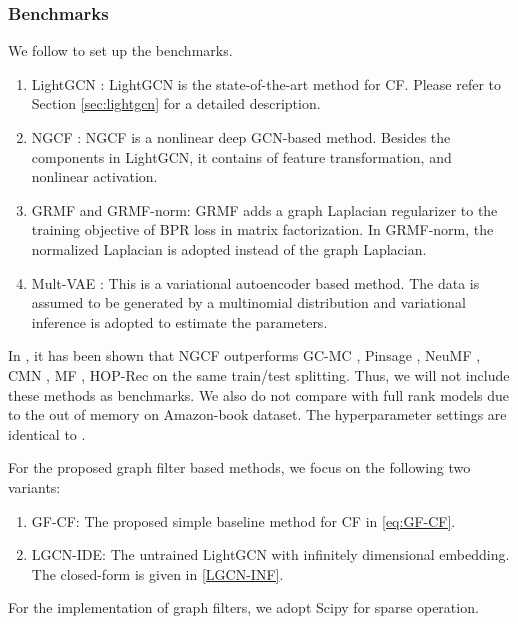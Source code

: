 \documentclass[sigconf]{acmart}
\begin{document}
\subsubsection{Benchmarks}
We follow \cite{he2020lightgcn} to set up the benchmarks.  
\begin{enumerate}
    \item LightGCN \cite{he2020lightgcn}: LightGCN is the state-of-the-art method for CF. Please refer to Section \ref{sec:lightgcn} for a detailed description. 
    \item NGCF \cite{wang2019neural}: NGCF is a nonlinear deep GCN-based method. Besides the components in LightGCN, it contains of feature transformation, and nonlinear activation. 
    \item GRMF and GRMF-norm\cite{rao2015collaborative,he2020lightgcn}: GRMF adds a graph Laplacian regularizer to the training objective of BPR loss in matrix factorization. In GRMF-norm, the normalized Laplacian is adopted instead of the graph Laplacian.
    \item Mult-VAE \cite{liang2018variational}: This is a variational autoencoder based method. The data is assumed to be generated by a multinomial distribution and variational inference is adopted to estimate the parameters. 
\end{enumerate}
In \cite{wang2019neural}, it has been shown that NGCF outperforms GC-MC \cite{berg2017graph}, Pinsage \cite{ying2018graph}, NeuMF \cite{he2017neural}, CMN \cite{ebesu2018collaborative}, MF \cite{rendle2012bpr}, HOP-Rec \cite{yang2018hop} on the same train/test splitting. Thus, we will not include these methods as benchmarks. We also do not compare with full rank models \cite{ning2011slim,steck2019markov} due to the out of memory on Amazon-book dataset. The hyperparameter settings are identical to \cite{he2020lightgcn}.

For the proposed graph filter based methods, we focus on the following two variants: 
\begin{enumerate}
\item GF-CF: The proposed simple baseline method for CF in \eqref{eq:GF-CF}.
    \item LGCN-IDE: The untrained LightGCN with infinitely dimensional embedding. The closed-form is given in \eqref{LGCN-INF}. 
\end{enumerate}
For the implementation of graph filters, we adopt Scipy \cite{virtanen2020scipy} for sparse operation. 
\end{document}
